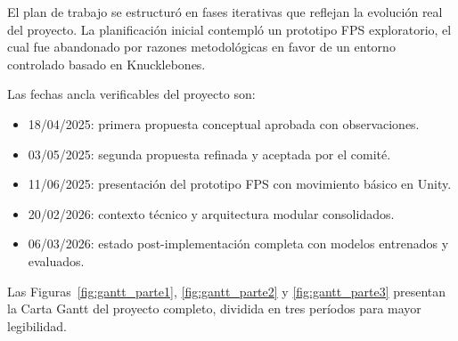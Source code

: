 El plan de trabajo se estructuró en fases iterativas que reflejan la evolución real del proyecto. La planificación inicial contempló un prototipo FPS exploratorio, el cual fue abandonado por razones metodológicas en favor de un entorno controlado basado en Knucklebones.

Las fechas ancla verificables del proyecto son:
\begin{itemize}
    \item 18/04/2025: primera propuesta conceptual aprobada con observaciones.
    \item 03/05/2025: segunda propuesta refinada y aceptada por el comité.
    \item 11/06/2025: presentación del prototipo FPS con movimiento básico en Unity.
    \item 20/02/2026: contexto técnico y arquitectura modular consolidados.
    \item 06/03/2026: estado post-implementación completa con modelos entrenados y evaluados.
\end{itemize}

Las Figuras~\ref{fig:gantt_parte1}, \ref{fig:gantt_parte2} y \ref{fig:gantt_parte3} presentan la Carta Gantt del proyecto completo, dividida en tres períodos para mayor legibilidad.

